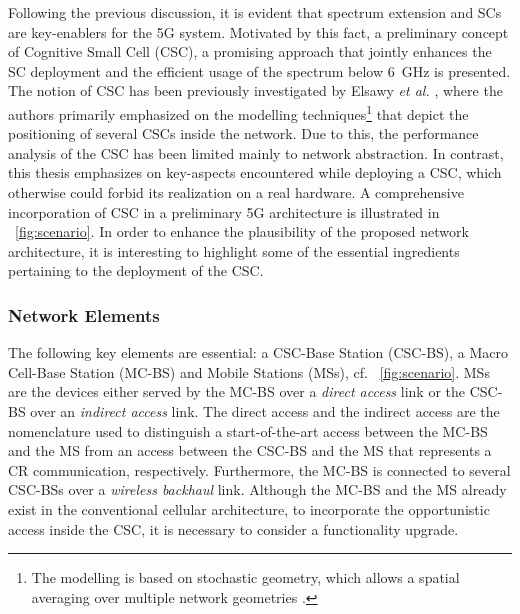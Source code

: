 Following the previous discussion, it is evident that spectrum extension and SCs are key-enablers for the 5G system.
Motivated by this fact, a preliminary concept of Cognitive Small Cell (CSC), a promising approach that jointly enhances the SC deployment and the efficient usage of the spectrum below \SI{6}{GHz} is presented. The notion of CSC has been previously investigated by Elsawy \textit{et al.} \cite{Elsawy13, Elsawy13_cmag}, where the authors primarily emphasized on the modelling techniques\footnote{The modelling is based on stochastic geometry, which allows a spatial averaging over multiple network geometries \cite{Haenggi, Haenggi08now}.} that depict the positioning of several CSCs inside the network. Due to this, the performance analysis of the CSC has been limited mainly to network abstraction. In contrast, this thesis emphasizes on key-aspects encountered while deploying a CSC, which otherwise could forbid its realization on a real hardware. %
 A comprehensive incorporation of CSC in a preliminary 5G architecture is illustrated in \figurename~\ref{fig:scenario}. In order to enhance the plausibility of the proposed network architecture, it is interesting to highlight some of the essential ingredients pertaining to the deployment of the CSC.

\subsubsection*{Network Elements}
 The following key elements are essential: a CSC-Base Station (CSC-BS), a Macro Cell-Base Station (MC-BS) and Mobile Stations (MSs), cf. \figurename~\ref{fig:scenario}. MSs are the devices either served by the MC-BS over a \textit{direct access} link or the CSC-BS over an \textit{indirect access} link. The direct access and the indirect access are the nomenclature used to distinguish a start-of-the-art access between the MC-BS and the MS from an access between the CSC-BS and the MS that represents a CR communication, respectively. Furthermore, the MC-BS is connected to several CSC-BSs over a \textit{wireless backhaul} link. Although the MC-BS and the MS already exist in the conventional cellular architecture, to incorporate the opportunistic access inside the CSC, it is necessary to consider a functionality upgrade.

